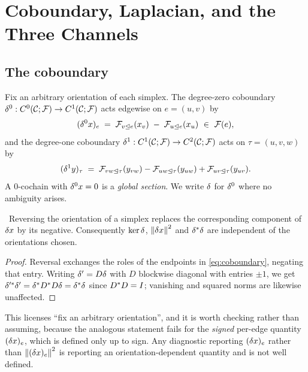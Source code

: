 \chapter{Coboundary, Laplacian, and the Three Channels}\label{ch:laplacian}

\section{The coboundary}

\begin{definition}[Coboundary]\label{def:coboundary}
Fix an arbitrary orientation of each simplex. The degree-zero coboundary
$\delta^0:C^{0}(\mathcal{C};\mathcal{F})\to C^{1}(\mathcal{C};\mathcal{F})$ acts edgewise on $e=(u,v)$ by
\begin{equation}\label{eq:coboundary}
  (\delta^0 x)_e\;=\;\mathcal{F}_{v\trianglelefteq e}(x_v)\;-\;\mathcal{F}_{u\trianglelefteq e}(x_u)
  \ \in\ \mathcal{F}(e),
\end{equation}
and the degree-one coboundary $\delta^1:C^{1}(\mathcal{C};\mathcal{F})\to C^{2}(\mathcal{C};\mathcal{F})$ acts on
$\tau=(u,v,w)$ by
\begin{equation}\label{eq:coboundary2}
  (\delta^1 y)_\tau\;=\;\mathcal{F}_{vw\trianglelefteq\tau}(y_{vw})
   -\mathcal{F}_{uw\trianglelefteq\tau}(y_{uw})+\mathcal{F}_{uv\trianglelefteq\tau}(y_{uv}).
\end{equation}
A $0$-cochain with $\delta^0x=0$ is a \emph{global section}. We write $\delta$
for $\delta^0$ where no ambiguity arises.
\end{definition}

\begin{lemma}\label{lem:orientation}
\Proved\ Reversing the orientation of a simplex replaces the corresponding
component of $\delta x$ by its negative. Consequently $\ker\delta$,
$\left\lVert \delta x \right\rVert^2$ and $\delta^{\ast}\delta$ are independent of the orientations
chosen.
\end{lemma}
\begin{proof}
Reversal exchanges the roles of the endpoints in \eqref{eq:coboundary},
negating that entry. Writing $\delta'=D\delta$ with $D$ blockwise diagonal with
entries $\pm1$, we get $\delta'^{\ast}\delta'=\delta^{\ast}D^{\ast}D\delta
=\delta^{\ast}\delta$ since $D^{\ast}D=I$; vanishing and squared norms are
likewise unaffected.
\end{proof}

\begin{remark}
This licenses ``fix an arbitrary orientation'', and it is worth checking
rather than assuming, because the analogous statement fails for the
\emph{signed} per-edge quantity $(\delta x)_e$, which is defined only up to
sign. Any diagnostic reporting $(\delta x)_e$ rather than
$\left\lVert (\delta x)_e \right\rVert^2$ is reporting an orientation-dependent quantity and is
not well defined.
\end{remark}

